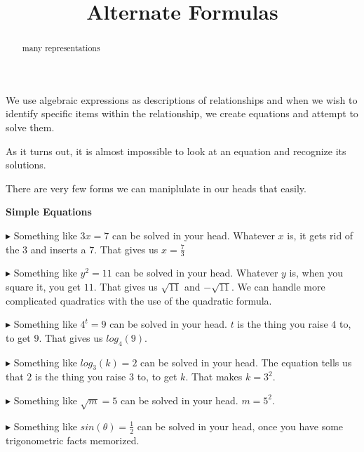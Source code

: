 \documentclass{ximera}
\title{Alternate Formulas}
\begin{document}
\begin{abstract}
many representations
\end{abstract}
\maketitle





We use algebraic expressions as descriptions of relationships and when we wish to identify specific items within the relationship, we create equations and attempt to solve them.

As it turns out, it is almost impossible to look at an equation and recognize its solutions.


There are very few forms we can maniplulate in our heads that easily.



\begin{summary} \textbf{\textcolor{blue!75!black}{Simple Equations}} 

$\blacktriangleright$ Something like $3x = 7$ can be solved in your head.  Whatever $x$ is, it gets rid of the $3$ and inserts a $7$.  That gives us $x =\frac{7}{3}$





$\blacktriangleright$ Something like $y^2 = 11$ can be solved in your head.  Whatever $y$ is, when you square it, you get $11$.  That gives us $\sqrt{11}$ and $-\sqrt{11}$.  We can handle more complicated  quadratics with the use of the quadratic formula.




$\blacktriangleright$ Something like $4^t = 9$ can be solved in your head.  $t$ is the thing you raise $4$ to, to get $9$.  That gives us $log_4(9)$.



$\blacktriangleright$ Something like $log_3(k) = 2$ can be solved in your head.  The equation tells us that $2$ is the thing you raise $3$ to, to get $k$.  That makes $k = 3^2$.



$\blacktriangleright$ Something like $\sqrt{m} = 5$ can be solved in your head.  $m = 5^2$.


$\blacktriangleright$ Something like $sin(\theta) = \frac{1}{2}$ can be solved in your head, once you have some trigonometric facts memorized.


\end{summary}
\end{document}
